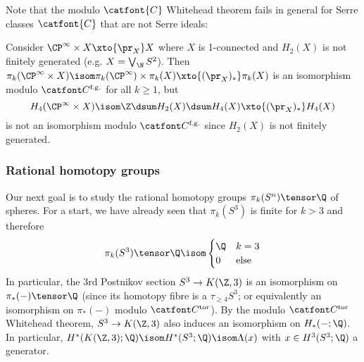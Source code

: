 Note that the modulo $\catfont{C}$ Whitehead theorem fails in general for Serre classes $\catfont{C}$ that are not Serre ideals:
\begin{example}
	Consider $\CP^\infty \times X \xto{\pr_X} X$ where $X$ is 1-connected and $H_2(X)$ is not finitely generated (e.g. $X = \bigvee_{\N} S^2$).
	Then $\pi_k(\CP^\infty \times X) \isom \pi_k(\CP^\infty) \times \pi_k(X) \xto{(\pr_X)_*} \pi_k(X)$ is an isomorphism modulo $\Cfg$ for all $k \geq 1$, but
	\begin{equation*}
		H_4(\CP^\infty \times X) \isom \Z \dsum H_2(X) \dsum H_4(X) \xto{(\pr_X)_*} H_4(X)
	\end{equation*}
	is not an isomorphism modulo $\Cfg$ since $H_2(X)$ is not finitely generated.
\end{example}

\subsubsection{Rational homotopy groups}
Our next goal is to study the rational homotopy groups $\pi_k(S^n) \tensor \Q$ of spheres. 
For a start, we have already seen that $\pi_k(S^3)$ is finite for $k > 3$ and therefore
\begin{equation*}
	\pi_k(S^3) \tensor \Q \isom \begin{cases}
		\Q 	& k = 3 \\
		0 	& \text{else}
	\end{cases}
\end{equation*}
In particular, the 3rd Postnikov section $S^3 \to K(\Z, 3)$ is an isomorphism on $\pi_*({{-}}) \tensor \Q$ (since its homotopy fibre is a $\tau_{\geq 4} S^3$; or equivalently an isomorphism on $\pi_*({{-}})$ modulo $\Ctor$).
By the modulo $\Ctor$ Whitehead theorem, $S^3 \to K(\Z, 3)$ also induces an isomorphism on $H_*({{-}}; \Q)$.
In particular, $H^*(K(\Z, 3); \Q) \isom H^*(S^3; \Q) \isom \Lambda(x)$ with $x \in H^3(S^3; \Q)$ a generator.

